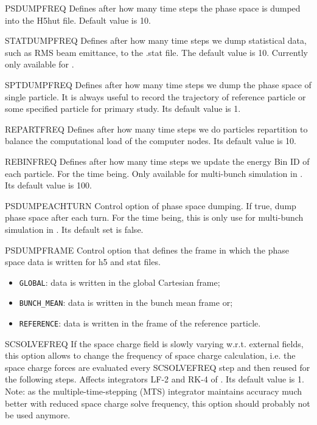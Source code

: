 \begin{kdescription}
  \item[PSDUMPFREQ]
  Defines after how many time steps the phase space is dumped into the H5hut file. Default value is 10.

  \item[STATDUMPFREQ]
  Defines after how many time steps we dump statistical data, such as RMS beam emittance, to the .stat file.
  The default value is 10. Currently only available for \opalt.

  \item[SPTDUMPFREQ]
  Defines after how many time steps we dump the phase space of single particle.
  It is always useful to record the trajectory of reference particle
  or some specified particle for primary study. Its default value is 1.

  \item[REPARTFREQ]
  Defines after how many time steps we do particles repartition to balance the computational load of
  the computer nodes. Its default value is 10.

  \item[REBINFREQ]
  Defines after how many time steps we update the energy Bin ID of each particle. For the time being.
  Only available for multi-bunch simulation in \opalcycl. Its default value is 100.

  \item[PSDUMPEACHTURN]
  Control option of phase space dumping. If true, dump phase space after each turn.
  For the time being, this is only use for multi-bunch simulation in \opalcycl. Its default set is false.

  \item[PSDUMPFRAME]
  Control option that defines the frame in which the phase space data is written for h5 and stat files.
    \begin{itemize}
      \item \verb|GLOBAL|: data is written in the global Cartesian frame;
      \item \verb|BUNCH_MEAN|: data is written in the bunch mean frame or;
      \item \verb|REFERENCE|: data is written in the frame of the reference particle.
    \end{itemize}

  \item[SCSOLVEFREQ]
  If the space charge field is slowly varying w.r.t. external fields,  this option allows to change the frequency of space charge calculation,
  i.e. the space charge forces are evaluated every SCSOLVEFREQ step and then reused for the following steps. Affects integrators LF-2 and RK-4 of \opalcycl. Its default value is 1. Note: as the multiple-time-stepping (MTS) integrator maintains accuracy much better with reduced space charge solve frequency, this option should probably not be used anymore.


\end{kdescription}
